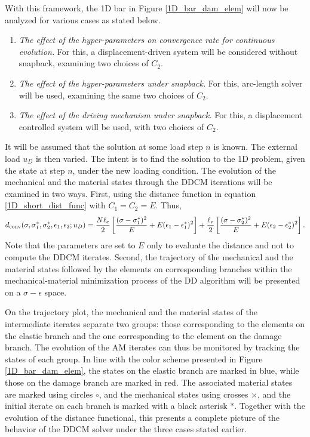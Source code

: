 \documentclass[10pt,review]{cas-sc}
\begin{document}
With this framework, the 1D bar in Figure \ref{1D_bar_dam_elem} will now be analyzed for various cases as stated below. 
\begin{enumerate}
	\item\label{case:rate} \emph{The effect of the hyper-parameters on convergence rate for continuous evolution.} For this, a displacement-driven system will be considered without snapback, examining two choices of $C_2$.
	\item\label{case:necessity_metric} \emph{The effect of the hyper-parameters under snapback.} For this, arc-length solver will be used, examining the same two choices of $C_2$.
	\item\label{case:necessity_solver} \emph{The effect of the driving mechanism under snapback.} For this, a displacement controlled system will be used, with two choices of $C_2$.
\end{enumerate}



It will be assumed that the solution at some load step $n$ is known. The external load $u_D$ is then varied. The intent is to find the solution to the 1D problem, given the state at step $n$, under the new loading condition. The evolution of the mechanical and the material states through the DDCM iterations will be examined in two ways. First, using the distance function in equation \ref{1D_short_dist_func} with $C_1=C_2=E$. Thus, 
\begin{equation}
	d_{\rm conv}(\sigma,\sigma_1^*,\sigma_2^*,\epsilon_1,\epsilon_2;u_D) = \frac{N \ell_e}{2} \left[ \frac{(\sigma - \sigma_1^*)^2}{E} +  E(\epsilon_1 - \epsilon_1^*)^2 \right] + \frac{\ell_e}{2}  \left[ \frac{(\sigma - \sigma_2^*)^2}{E} +  E(\epsilon_2 - \epsilon_2^*)^2 \right]. \label{1D_short_dist_func_conv}
\end{equation}
Note that the parameters are set to $E$ only to evaluate the distance and not to compute the DDCM iterates. Second, the trajectory of the mechanical and the material states followed by the elements on corresponding branches within the mechanical-material minimization process of the DD algorithm will be presented on a $\sigma-\epsilon$ space.
	
On the trajectory plot, the mechanical and the material states of the intermediate iterates separate two groups: those corresponding to the elements on the elastic branch and the one corresponding to the element on the damage branch. The evolution of the AM iterates can thus be monitored by tracking the states of each group. In line with the color scheme presented in Figure \ref{1D_bar_dam_elem}, the states on the elastic branch are marked in blue, while those on the damage branch are marked in red. The associated material states are marked using circles $\circ$, and the mechanical states using crosses $\times$, and the initial iterate on each branch is marked with a black asterisk $\ast$. Together with the evolution of the distance functional, this presents a complete picture of the behavior of the DDCM solver under the three cases stated earlier.
\end{document}
